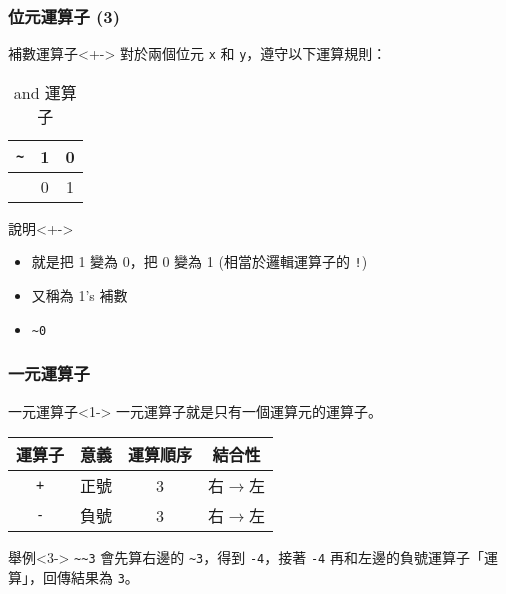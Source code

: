 \documentclass[utf8]{beamer}
\begin{document}
\begin{CJK}{UTF8}{bkai}
\begin{frame}[fragile]
  \frametitle{位元運算子 (3)}
  \begin{block}{補數運算子}<+->
    對於兩個位元 \lstinline{x}{} 和 \lstinline{y}{}，遵守以下運算規則：
    \begin{table}[h]
      \begin{tabular}{|c||c|c|}
      \hline
      \lstinline{~}{} & \alert{1} & \alert{0}\\
      \hline
                      & 0         & 1\\
      \hline
      \end{tabular}
      \caption{and 運算子}
    \end{table}
  \end{block}
  \begin{exampleblock}{說明}<+->
    \begin{itemize}
    \item 就是把 1 變為 0，把 0 變為 1 (相當於邏輯運算子的 \lstinline{!}{})
    \item<+-> 又稱為 1's 補數
    \item<+-> \lstinline{~0}{}
    \end{itemize}
  \end{exampleblock}
\end{frame}

\begin{frame}[fragile]
  \frametitle{一元運算子}
  \begin{block}{一元運算子}<1->
    \alert{一元運算子}就是只有一個運算元的運算子。
    \pause
    \begin{table}[h]
      \begin{tabular}{|c|c|c|c|}
      \hline
      運算子           & 意義 & 運算順序 & 結合性\\
      \hline
      \lstinline{+}{} & 正號 & 3      & \alert{右$\rightarrow$左}\\
      \hline
      \lstinline{-}{} & 負號 & 3      & \alert{右$\rightarrow$左}\\
      \hline
      \end{tabular}
    \end{table}
  \end{block}
  \begin{exampleblock}{舉例}<3->
  \lstinline{~~3}{} 會先算右邊的 \lstinline{~3}{}，得到 \lstinline{-4}{}，接著 \lstinline{-4}{} 再和左邊的負號運算子「運算」，回傳結果為 \lstinline{3}{}。
  \end{exampleblock}
\end{frame}


\end{CJK}
\end{document}
